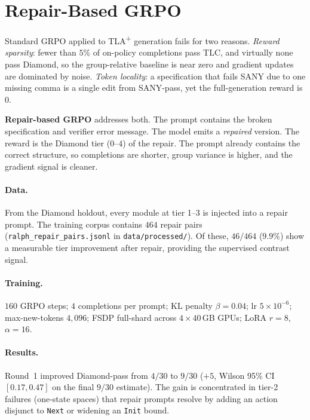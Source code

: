\documentclass[10pt,twocolumn]{article}
\begin{document}
\section{Repair-Based GRPO}
\label{sec:grpo}

Standard GRPO applied to TLA\textsuperscript{+} generation fails for two
reasons.
\emph{Reward sparsity}: fewer than $5\%$ of on-policy completions pass TLC,
and virtually none pass Diamond, so the group-relative baseline is near zero
and gradient updates are dominated by noise.
\emph{Token locality}: a specification that fails SANY due to one missing comma
is a single edit from SANY-pass, yet the full-generation reward is $0$.

\textbf{Repair-based GRPO} addresses both.
The prompt contains the broken specification and verifier error message.
The model emits a \emph{repaired} version.
The reward is the Diamond tier ($0$--$4$) of the repair.
The prompt already contains the correct structure, so completions are shorter,
group variance is higher, and the gradient signal is cleaner.

\paragraph{Data.}
From the Diamond holdout, every module at tier 1--3 is injected into a repair
prompt.
The training corpus contains $464$ repair pairs
(\texttt{ralph\_repair\_pairs.jsonl} in \texttt{data/processed/}).
Of these, $46/464$ ($9.9\%$) show a measurable tier improvement after repair,
providing the supervised contrast signal.

\paragraph{Training.}
$160$ GRPO steps; $4$ completions per prompt; KL penalty $\beta\!=\!0.04$;
lr $5\!\times\!10^{-6}$; max-new-tokens $4{,}096$; FSDP full-shard across
$4\times 40$\,GB GPUs; LoRA $r\!=\!8$, $\alpha\!=\!16$.

\paragraph{Results.}
Round~1 improved Diamond-pass from $4/30$ to $9/30$ ($+5$, Wilson 95\%
CI $[0.17, 0.47]$ on the final $9/30$ estimate).
The gain is concentrated in tier-2 failures (one-state spaces) that repair
prompts resolve by adding an action disjunct to \texttt{Next} or widening
an \texttt{Init} bound.
\end{document}
